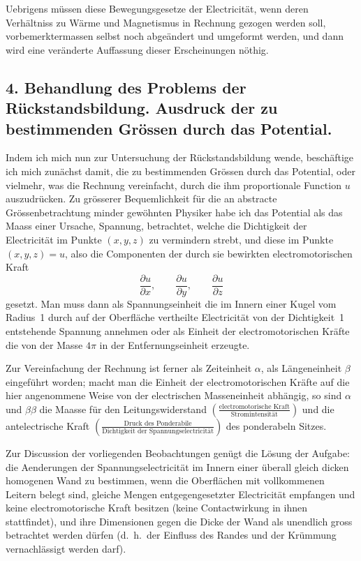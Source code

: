 \documentclass[12pt,a4paper]{article}
\begin{document}
Uebrigens m\"ussen diese Bewegungsgesetze der Electricit\"at, wenn deren Verh\"altniss zu W\"arme und Magnetismus in Rechnung gezogen werden soll, vorbemerktermassen selbst noch abge\"andert und umgeformt werden, und dann wird eine ver\"anderte Auffassung dieser Erscheinungen n\"othig.

\newpage

\subsection*{4. Behandlung des Problems der R\"uckstandsbildung. Ausdruck der zu bestimmenden Gr\"ossen durch das Potential.}

Indem ich mich nun zur Untersuchung der R\"uckstandsbildung wende, besch\"aftige ich mich zun\"achst damit, die zu bestimmenden Gr\"ossen durch das Potential, oder vielmehr, was die Rechnung vereinfacht, durch die ihm proportionale Function $u$ auszudr\"ucken. Zu gr\"osserer Bequemlichkeit f\"ur die an abstracte Gr\"ossenbetrachtung minder gew\"ohnten Physiker habe ich das Potential als das Maass einer Ursache, Spannung, betrachtet, welche die Dichtigkeit der Electricit\"at im Punkte $(x,y,z)$ zu vermindern strebt, und diese im Punkte $(x,y,z) = u$, also die Componenten der durch sie bewirkten electromotorischen Kraft
\[
\frac{\partial u}{\partial x}, \qquad \frac{\partial u}{\partial y}, \qquad \frac{\partial u}{\partial z}
\]
gesetzt. Man muss dann als Spannungseinheit die im Innern einer Kugel vom Radius~1 durch auf der Oberfl\"ache vertheilte Electricit\"at von der Dichtigkeit~1 entstehende Spannung annehmen oder als Einheit der electromotorischen Kr\"afte die von der Masse $4\pi$ in der Entfernungseinheit erzeugte.

Zur Vereinfachung der Rechnung ist ferner als Zeiteinheit $\alpha$, als L\"angeneinheit $\beta$ eingef\"uhrt worden; macht man die Einheit der electromotorischen Kr\"afte auf die hier angenommene Weise von der electrischen Masseneinheit abh\"angig, so sind $\alpha$ und $\beta\beta$ die Maasse f\"ur den Leitungswiderstand $\left(\frac{\text{electromotorische Kraft}}{\text{Stromintensit\"at}}\right)$ und die antelectrische Kraft $\left(\frac{\text{Druck des Ponderabile}}{\text{Dichtigkeit der Spannungselectricit\"at}}\right)$ des ponderabeln Sitzes.

Zur Discussion der vorliegenden Beobachtungen gen\"ugt die L\"osung der Aufgabe: die Aenderungen der Spannungselectricit\"at im Innern einer \"uberall gleich dicken homogenen Wand zu bestimmen, wenn die Oberfl\"achen mit vollkommenen Leitern belegt sind, gleiche Mengen entgegengesetzter Electricit\"at empfangen und keine electromotorische Kraft besitzen (keine Contactwirkung in ihnen stattfindet), und ihre Dimensionen gegen die Dicke der Wand als unendlich gross betrachtet werden d\"urfen (d.\ h.\ der Einfluss des Randes und der Kr\"ummung vernachl\"assigt werden darf).
\end{document}
